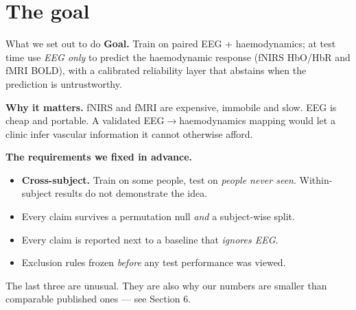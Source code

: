 \documentclass[aspectratio=169,11pt]{beamer}
\begin{document}
\section{The goal}
\begin{frame}{What we set out to do}
\textbf{Goal.} Train on paired EEG + haemodynamics; at test time use \emph{EEG only}
to predict the haemodynamic response (fNIRS HbO/HbR and fMRI BOLD), with a
calibrated reliability layer that abstains when the prediction is untrustworthy.

\vspace{0.5em}
\textbf{Why it matters.} fNIRS and fMRI are expensive, immobile and slow. EEG is
cheap and portable. A validated EEG$\rightarrow$haemodynamics mapping would let a
clinic infer vascular information it cannot otherwise afford.

\vspace{0.5em}
\textbf{The requirements we fixed in advance.}
\begin{itemize}
  \item \textbf{Cross-subject.} Train on some people, test on \emph{people never
        seen}. Within-subject results do not demonstrate the idea.
  \item Every claim survives a permutation null \emph{and} a subject-wise split.
  \item Every claim is reported next to a baseline that \emph{ignores EEG}.
  \item Exclusion rules frozen \emph{before} any test performance was viewed.
\end{itemize}

\vspace{0.4em}
\textcolor{warn}{The last three are unusual. They are also why our numbers are
smaller than comparable published ones --- see Section 6.}
\end{frame}
\end{document}
